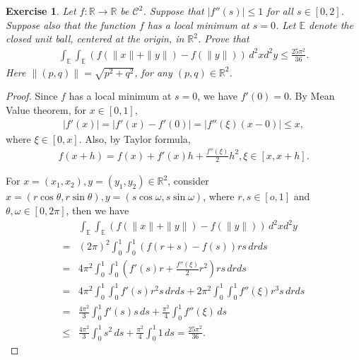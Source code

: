 \documentclass[11pt]{article}
\newtheorem{exercise}{Exercise}[section]
\theoremstyle{definition}
\numberwithin{equation}{subsection}
\begin{document}
\medskip

\begin{exercise}{\rm *}
Let $f: \mathbb{R} \to \mathbb{R}$ be $\mathcal{C}^2$. Suppose that $\left|f''(s) \right| \leq 1$ for all $s \in [0,2]$. Suppose also that the function $f$ has a local minimum at $s = 0$. Let $\mathbb{E}$ denote the closed unit ball, centered at the origin, in $\mathbb{R}^2$. Prove that
\begin{align*}
    \int_{\mathbb{E}} \int_{\mathbb{E}} \left(f(\|x\| + \|y\|) - f(\|y\|) \right)\, d^2x d^2y \leq \frac{25\pi^2}{36}.
\end{align*}
Here $\|(p,q)\| = \sqrt{p^2 + q^2}$, for any $(p,q) \in \mathbb{R}^2$.
\end{exercise}
\begin{proof}
Since $f$ has a local minimum at $s = 0$, we have $f'(0) = 0$. By Mean Value theorem, for $x \in [0,1]$,
\begin{align*}
    \left|f'(x)\right| = \left|f'(x) - f'(0)\right| = \left|f''(\xi) (x - 0) \right| \leq x,
\end{align*}
where $\xi \in [0,x]$. Also, by Taylor formula, 
\begin{align*}
    f(x + h) = f(x) + f'(x)h + \frac{f''(\xi)}{2}h^2, \xi \in [x, x+ h].
\end{align*}

For $x = (x_1, x_2), y = (y_1, y_2) \in \mathbb{R}^2$, consider $x = (r \cos \theta, r \sin \theta), y = (s \cos \omega, s \sin \omega)$, where $r, s \in [o,1]$ and $\theta, \omega \in [0,2\pi]$, then we have
\begin{align*}
    & \int_{\mathbb{E}} \int_{\mathbb{E}} \left(f(\|x\| + \|y\|) - f(\|y\|) \right)\, d^2x d^2y \\
    = & (2\pi)^2 \int^1_0 \int^1_0 \left( f(r + s) - f(s) \right) rs\, dr ds \\
    = & 4\pi^2 \int^1_0 \int^1_0 \left( f'(s)r + \frac{f''(\xi)}{2}r^2 \right)rs \, drds \\
    = & 4\pi^2 \int^1_0 \int^1_0 f'(s)r^2s \, drds + 2\pi^2 \int^1_0 \int^1_0 f''(\xi)r^3s\, drds \\
    = & \frac{4\pi^2}{3} \int^1_0 f'(s)s \, ds + \frac{\pi^2}{4} \int^1_0 f''(\xi) \, ds \\
    \leq & \frac{4\pi^2}{3} \int^1_0 s^2 \, ds + \frac{\pi^2}{4} \int^1_0 1 \, ds = \frac{25\pi^2}{36}.
\end{align*}
\end{proof}






\newpage


\end{document}
